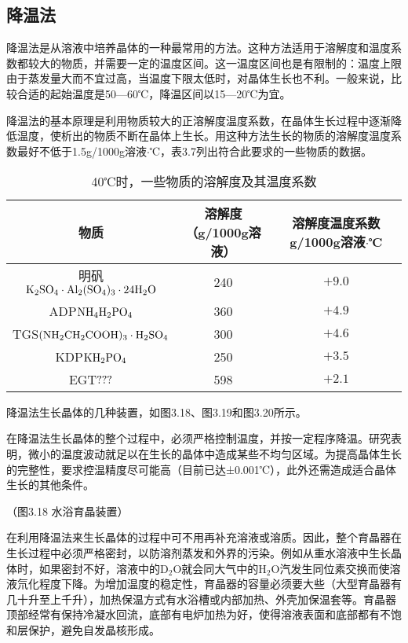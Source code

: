 ﻿\subsection{降温法}
降温法是从溶液中培养晶体的一种最常用的方法。这种方法适用于溶解度和温度系数都较大的物质，并需要一定的温度区间。这一温度区间也是有限制的：温度上限由于蒸发量大而不宜过高，当温度下限太低时，对晶体生长也不利。一般来说，比较合适的起始温度是50---60℃，降温区间以15---20℃为宜。

降温法的基本原理是利用物质较大的正溶解度温度系数，在晶体生长过程中逐渐降低温度，使析出的物质不断在晶体上生长。用这种方法生长的物质的溶解度温度系数最好不低于1.5g/1000g溶液$\cdot$℃，表3.7列出符合此要求的一些物质的数据。

\begin{table}[h]
\begin{tabular}{c|c|c}\toprule
物质 & \tabincell{c}{溶解度\\（g/1000g溶液）} & \tabincell{c}{溶解度温度系数\\g/1000g溶液$\cdot$℃}\\\hline
明矾\quad$\rm K_2SO_4\cdot Al_2(SO_4)_3\cdot 24H_2O$ & 240 & $+9.0$\\
ADP\quad$\rm NH_4H_2PO_4$ & 360 & $+4.9$\\
TGS\quad$\rm (NH_2CH_2COOH)_3\cdot H_2SO_4$ & 300 & $+4.6$\\
KDP\quad$\rm KH_2PO_4$ & 250 & $+3.5$\\
EGT\quad$\rm ???$ & 598 & $+2.1$\\
\bottomrule
\end{tabular}
\caption{40℃时，一些物质的溶解度及其温度系数}
\end{table}

降温法生长晶体的几种装置，如图3.18、图3.19和图3.20所示。

在降温法生长晶体的整个过程中，必须严格控制温度，并按一定程序降温。研究表明，微小的温度波动就足以在生长的晶体中造成某些不均匀区域。为提高晶体生长的完整性，要求控温精度尽可能高（目前已达±0.001℃），此外还需造成适合晶体生长的其他条件。

（图3.18  水浴育晶装置）

在利用降温法来生长晶体的过程中可不用再补充溶液或溶质。因此，整个育晶器在生长过程中必须严格密封，以防溶剂蒸发和外界的污染。例如从重水溶液中生长晶体时，如果密封不好，溶液中的D$_2$O就会同大气中的H$_2$O汽发生同位素交换而使溶液氘化程度下降。为增加温度的稳定性，育晶器的容量必须要大些（大型育晶器有几十升至上千升），加热保温方式有水浴槽或内部加热、外壳加保温套等。育晶器顶部经常有保持冷凝水回流，底部有电炉加热为好，使得溶液表面和底部都有不饱和层保护，避免自发晶核形成。


